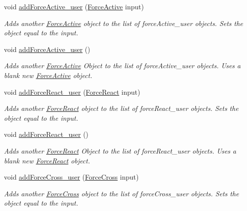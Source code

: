 \begin{DoxyCompactItemize}
void \hyperlink{classosea_1_1ofreq_1_1_system_a66aaf1fda6d136711c53b0196fd2a50f}{add\-Force\-Active\-\_\-user} (\hyperlink{classosea_1_1ofreq_1_1_force_active}{Force\-Active} input)
\begin{DoxyCompactList}\small\item\em Adds another \hyperlink{classosea_1_1ofreq_1_1_force_active}{Force\-Active} object to the list of force\-Active\-\_\-user objects. Sets the object equal to the input. \end{DoxyCompactList}\item 
void \hyperlink{classosea_1_1ofreq_1_1_system_ad6cb91afdaca6870cafda01933fa85ea}{add\-Force\-Active\-\_\-user} ()
\begin{DoxyCompactList}\small\item\em Adds another \hyperlink{classosea_1_1ofreq_1_1_force_active}{Force\-Active} Object to the list of force\-Active\-\_\-user objects. Uses a blank new \hyperlink{classosea_1_1ofreq_1_1_force_active}{Force\-Active} object. \end{DoxyCompactList}\item 
void \hyperlink{classosea_1_1ofreq_1_1_system_aa51930622fa8340b03e6905b23358982}{add\-Force\-React\-\_\-user} (\hyperlink{classosea_1_1ofreq_1_1_force_react}{Force\-React} input)
\begin{DoxyCompactList}\small\item\em Adds another \hyperlink{classosea_1_1ofreq_1_1_force_react}{Force\-React} object to the list of force\-React\-\_\-user objects. Sets the object equal to the input. \end{DoxyCompactList}\item 
void \hyperlink{classosea_1_1ofreq_1_1_system_aef2d7a3af23839f8c104058f2e4e11e2}{add\-Force\-React\-\_\-user} ()
\begin{DoxyCompactList}\small\item\em Adds another \hyperlink{classosea_1_1ofreq_1_1_force_react}{Force\-React} Object to the list of force\-React\-\_\-user objects. Uses a blank new \hyperlink{classosea_1_1ofreq_1_1_force_react}{Force\-React} object. \end{DoxyCompactList}\item 
void \hyperlink{classosea_1_1ofreq_1_1_system_afa58e77f961286c082e18193aeb14fc7}{add\-Force\-Cross\-\_\-user} (\hyperlink{classosea_1_1ofreq_1_1_force_cross}{Force\-Cross} input)
\begin{DoxyCompactList}\small\item\em Adds another \hyperlink{classosea_1_1ofreq_1_1_force_cross}{Force\-Cross} object to the list of force\-Cross\-\_\-user objects. Sets the object equal to the input. \end{DoxyCompactList}\item 

\end{DoxyCompactItemize}
